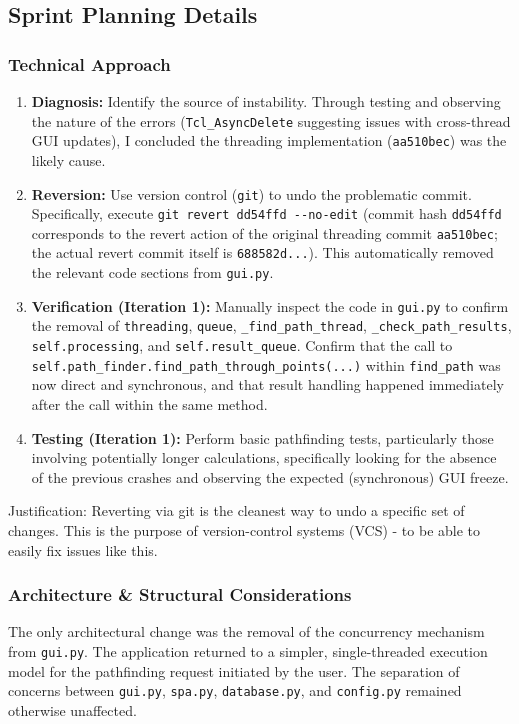 \clearpage
\subsection{Sprint Planning Details}

\subsubsection{Technical Approach}
\begin{enumerate}
	\item \textbf{Diagnosis:} Identify the source of instability. Through testing and observing the nature of the errors (\verb|Tcl_AsyncDelete| suggesting issues with cross-thread GUI updates), I concluded the threading implementation (\verb|aa510bec|) was the likely cause.
	\item \textbf{Reversion:} Use version control (\verb|git|) to undo the problematic commit. Specifically, execute \verb|git revert dd54ffd --no-edit| (commit hash \verb|dd54ffd| corresponds to the revert action of the original threading commit \verb|aa510bec|; the actual revert commit itself is \verb|688582d...|). This automatically removed the relevant code sections from \verb|gui.py|.
	\item \textbf{Verification (Iteration 1):} Manually inspect the code in \verb|gui.py| to confirm the removal of \verb|threading|, \verb|queue|, \verb|_find_path_thread|, \verb|_check_path_results|, \verb|self.processing|, and \verb|self.result_queue|. Confirm that the call to \verb|self.path_finder.find_path_through_points(...)| within \verb|find_path| was now direct and synchronous, and that result handling happened immediately after the call within the same method.
	\item \textbf{Testing (Iteration 1):} Perform basic pathfinding tests, particularly those involving potentially longer calculations, specifically looking for the absence of the previous crashes and observing the expected (synchronous) GUI freeze.
\end{enumerate}
Justification: Reverting via git is the cleanest way to undo a specific set of changes. This is the purpose of version-control systems (VCS) - to be able to easily fix issues like this.

\subsubsection{Architecture \& Structural Considerations}
The only architectural change was the removal of the concurrency mechanism from \verb|gui.py|. The application returned to a simpler, single-threaded execution model for the pathfinding request initiated by the user. The separation of concerns between \verb|gui.py|, \verb|spa.py|, \verb|database.py|, and \verb|config.py| remained otherwise unaffected.

